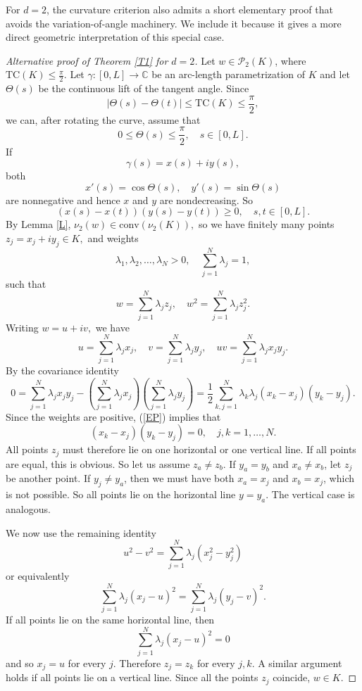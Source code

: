 \documentclass[10pt,a4paper]{amsart}
\newcommand{\C}{\mathbb{C}}
\newcommand{\Conv}{{\mathrm{conv}}}
\newcommand{\T}{\mathrm{TC}}
\newcommand{\cP}{\mathcal{P}}
\numberwithin{equation}{section}
\begin{document}
For $d=2$, the curvature criterion also admits a short elementary proof
that avoids the variation-of-angle machinery. We include it because it
gives a more direct geometric interpretation of this special case.

\begin{proof}[Alternative proof of Theorem \ref{T1} for $d=2$] 
Let $w\in\cP_2(K)$, where $\T(K)\le\frac{\pi}{2}$. Let $\gamma:[0,L]\to\C$ be an arc-length parametrization of $K$ and let $\Theta(s)$ be the continuous lift of the tangent angle. Since 
\[|\Theta(s)-\Theta(t)|\le \T(K)\le\frac{\pi}{2},\] we can, after rotating the curve, assume that
\[0\le \Theta(s)\le \frac{\pi}{2},\quad s\in[0,L].\] 
If \[\gamma(s)=x(s)+iy(s),\]
both 
\[x'(s)=\cos \Theta(s),\quad y'(s)=\sin \Theta(s)\]
are nonnegative and hence $x$ and $y$ are nondecreasing. So 
\begin{equation} \label{EP}(x(s)-x(t))(y(s)-y(t))\ge 0,\quad s,t\in[0,L].\end{equation}
By Lemma \ref{L}, $\nu_2(w)\in\Conv(\nu_2(K)),$
so we have finitely many points $z_j=x_j+iy_j\in K,$ and 
weights
\[\lambda_1,\lambda_2,\ldots,\lambda_N>0,\quad \sum_{j=1}^N\lambda_j=1,\] such that
\[w=\sum_{j=1}^N\lambda_jz_j,\quad w^2=\sum_{j=1}^N\lambda_jz_j^2.\] 
Writing $w=u+iv,$
we have 
\[u=\sum_{j=1}^N\lambda_{j}x_j,\quad v=\sum_{j=1}^N\lambda_{j}y_j,\quad uv=\sum_{j=1}^N\lambda_{j}x_jy_j.\]
By the covariance identity
\[0=\sum_{j=1}^N\lambda_{j}x_jy_j-\left(\sum_{j=1}^N\lambda_{j}x_j\right)\left(\sum_{j=1}^N\lambda_{j}y_j\right)=\frac{1}{2}\sum_{k,j=1}^N\lambda_k\lambda_j(x_k-x_j)(y_k-y_j).\]
Since the weights are positive, (\ref{EP}) implies that
\[(x_k-x_j)(y_k-y_j)=0,\quad j,k=1,\ldots,N.\] 
All points $z_j$ must therefore lie on one horizontal or one vertical line. If all points are equal, this is obvious. So let us assume $z_a\ne z_b$. If $y_a=y_b$ and $x_a\neq x_b$, let $z_j$ be another point. If $y_j\neq y_a$, then we must have both $x_a=x_j$ and $x_b=x_j$, which is not possible. So all points lie on the horizontal line $y=y_a$. The vertical case is analogous.

We now use the remaining identity
\[u^2-v^2=\sum_{j=1}^N\lambda_j(x_j^2-y_j^2)\]
or equivalently
\[\sum_{j=1}^N\lambda_j(x_j-u)^2=\sum_{j=1}^N\lambda_j(y_j-v)^2.\]
If all points lie on the same horizontal line, then  
\[\sum_{j=1}^N\lambda_j(x_j-u)^2=0\] 
and so $x_j=u$ for every $j$. Therefore $z_j=z_k$ for every $j,k$. A similar argument holds if all points lie on a vertical line. 
Since all the points $z_j$ coincide, $w\in K$. 
\end{proof}
\end{document}
